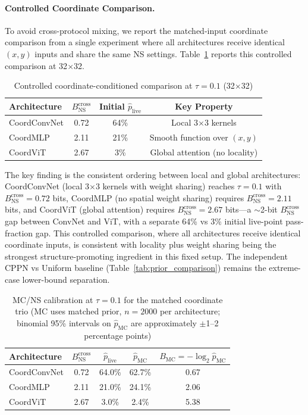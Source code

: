\documentclass{article}
\begin{document}
\paragraph{Controlled Coordinate Comparison.} To avoid cross-protocol mixing, we report the matched-input coordinate comparison from a single experiment where all architectures receive identical $(x,y)$ inputs and share the same NS settings. Table~\ref{tab:architecture_hierarchy} reports this controlled comparison at 32$\times$32.

\begin{table}[H]
\centering
\caption{Controlled coordinate-conditioned comparison at $\tau = 0.1$ (32$\times$32)}
\label{tab:architecture_hierarchy}
\begin{tabular}{lccc}
\toprule
Architecture & $B_{\text{NS}}^{\text{cross}}$ & Initial $\hat p_{\text{live}}$ & Key Property \\
\midrule
CoordConvNet & 0.72 & 64\% & Local 3$\times$3 kernels \\
CoordMLP & 2.11 & 21\% & Smooth function over $(x,y)$ \\
CoordViT & 2.67 & 3\% & Global attention (no locality) \\
\bottomrule
\end{tabular}
\end{table}

The key finding is the consistent ordering between local and global architectures: CoordConvNet (local 3$\times$3 kernels with weight sharing) reaches $\tau = 0.1$ with $B_{\text{NS}}^{\text{cross}}=0.72$ bits, CoordMLP (no spatial weight sharing) requires $B_{\text{NS}}^{\text{cross}}=2.11$ bits, and CoordViT (global attention) requires $B_{\text{NS}}^{\text{cross}}=2.67$ bits---a $\sim$2-bit $B_{\text{NS}}^{\text{cross}}$ gap between ConvNet and ViT, with a separate 64\% vs 3\% initial live-point pass-fraction gap. This controlled comparison, where all architectures receive identical coordinate inputs, is consistent with locality plus weight sharing being the strongest structure-promoting ingredient in this fixed setup. The independent CPPN vs Uniform baseline (Table~\ref{tab:prior_comparison}) remains the extreme-case lower-bound separation.

\begin{table}[H]
\centering
\caption{MC/NS calibration at $\tau=0.1$ for the matched coordinate trio (MC uses matched prior, $n=2000$ per architecture; binomial 95\% intervals on $\hat p_{\text{MC}}$ are approximately $\pm$1--2 percentage points)}
\label{tab:mc_ns_coord_calibration}
\begin{tabular}{lcccc}
\toprule
Architecture & $B_{\text{NS}}^{\text{cross}}$ & $\hat p_{\text{live}}$ & $\hat p_{\text{MC}}$ & $B_{\text{MC}}=-\log_2\hat p_{\text{MC}}$ \\
\midrule
CoordConvNet & 0.72 & 64.0\% & 62.7\% & 0.67 \\
CoordMLP & 2.11 & 21.0\% & 24.1\% & 2.06 \\
CoordViT & 2.67 & 3.0\% & 2.4\% & 5.38 \\
\bottomrule
\end{tabular}
\end{table}
\end{document}
